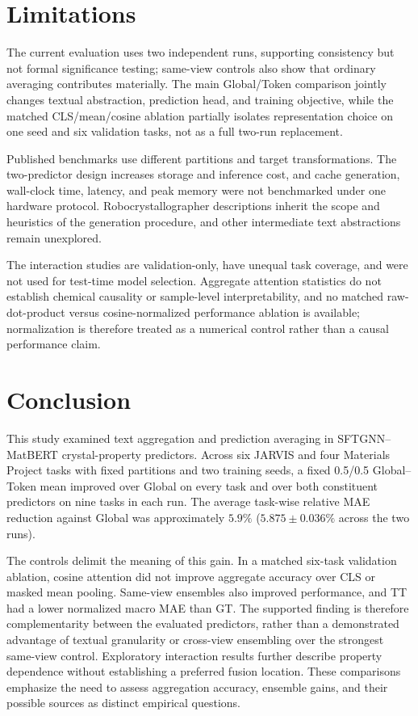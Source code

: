 \documentclass[a4paper,fleqn]{cas-sc}
\begin{document}
\section{Limitations}
The current evaluation uses two independent runs, supporting consistency but not formal significance testing; same-view controls also show that ordinary averaging contributes materially. The main Global/Token comparison jointly changes textual abstraction, prediction head, and training objective, while the matched CLS/mean/cosine ablation partially isolates representation choice on one seed and six validation tasks, not as a full two-run replacement.

Published benchmarks use different partitions and target transformations. The two-predictor design increases storage and inference cost, and cache generation, wall-clock time, latency, and peak memory were not benchmarked under one hardware protocol. Robocrystallographer descriptions inherit the scope and heuristics of the generation procedure, and other intermediate text abstractions remain unexplored.

The interaction studies are validation-only, have unequal task coverage, and were not used for test-time model selection. Aggregate attention statistics do not establish chemical causality or sample-level interpretability, and no matched raw-dot-product versus cosine-normalized performance ablation is available; normalization is therefore treated as a numerical control rather than a causal performance claim.

\section{Conclusion}
This study examined text aggregation and prediction averaging in SFTGNN--MatBERT crystal-property predictors. Across six JARVIS and four Materials Project tasks with fixed partitions and two training seeds, a fixed 0.5/0.5 Global--Token mean improved over Global on every task and over both constituent predictors on nine tasks in each run. The average task-wise relative MAE reduction against Global was approximately $5.9\%$ ($5.875\pm0.036\%$ across the two runs).

The controls delimit the meaning of this gain. In a matched six-task validation ablation, cosine attention did not improve aggregate accuracy over CLS or masked mean pooling. Same-view ensembles also improved performance, and TT had a lower normalized macro MAE than GT. The supported finding is therefore complementarity between the evaluated predictors, rather than a demonstrated advantage of textual granularity or cross-view ensembling over the strongest same-view control. Exploratory interaction results further describe property dependence without establishing a preferred fusion location. These comparisons emphasize the need to assess aggregation accuracy, ensemble gains, and their possible sources as distinct empirical questions.
\end{document}
